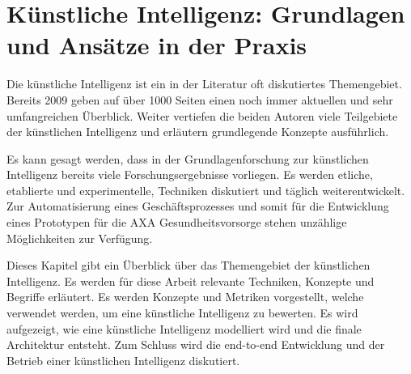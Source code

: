 
\section{Künstliche Intelligenz: Grundlagen und Ansätze in der Praxis}
\label{chap:ai}


Die künstliche Intelligenz ist ein in der Literatur oft diskutiertes Themengebiet. Bereits 2009 geben \textcite{Russell2009} auf über 1000 Seiten einen noch immer aktuellen und sehr umfangreichen Überblick. Weiter vertiefen die beiden Autoren viele Teilgebiete der künstlichen Intelligenz und erläutern grundlegende Konzepte ausführlich.


Es kann gesagt werden, dass in der Grundlagenforschung zur künstlichen Intelligenz bereits viele Forschungsergebnisse vorliegen. Es werden etliche, etablierte und experimentelle, Techniken diskutiert und täglich weiterentwickelt. Zur Automatisierung eines Geschäftsprozesses und somit für die Entwicklung eines Prototypen für die AXA Gesundheitsvorsorge stehen unzählige Möglichkeiten zur Verfügung.

Dieses Kapitel gibt ein Überblick über das Themengebiet der künstlichen Intelligenz. Es werden für diese Arbeit relevante Techniken, Konzepte und Begriffe erläutert. Es werden Konzepte und Metriken vorgestellt, welche verwendet werden, um eine künstliche Intelligenz zu bewerten. Es wird aufgezeigt, wie eine künstliche Intelligenz modelliert wird und die finale Architektur entsteht. Zum Schluss wird die end-to-end Entwicklung und der Betrieb einer künstlichen Intelligenz diskutiert.

